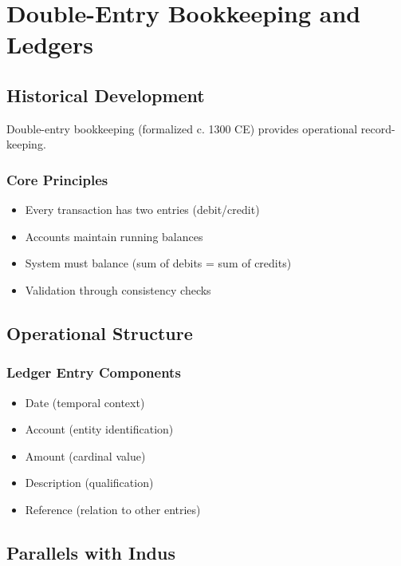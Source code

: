 \section{Double-Entry Bookkeeping and Ledgers}

\subsection{Historical Development}

Double-entry bookkeeping (formalized c. 1300 CE) provides operational record-keeping.

\subsubsection{Core Principles}
\begin{itemize}
    \item Every transaction has two entries (debit/credit)
    \item Accounts maintain running balances
    \item System must balance (sum of debits = sum of credits)
    \item Validation through consistency checks
\end{itemize}

\subsection{Operational Structure}

\subsubsection{Ledger Entry Components}
\begin{itemize}
    \item Date (temporal context)
    \item Account (entity identification)
    \item Amount (cardinal value)
    \item Description (qualification)
    \item Reference (relation to other entries)
\end{itemize}

\subsection{Parallels with Indus}

